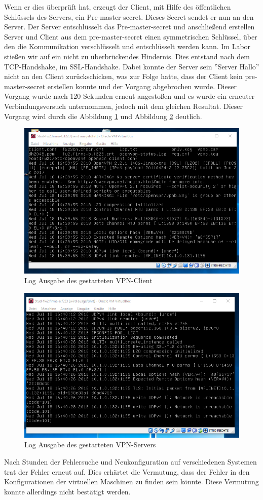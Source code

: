 Wenn er dies überprüft hat, erzeugt der Client, mit Hilfe des öffentlichen Schlüssels des Servers, ein Pre-master-secret. Dieses Secret sendet er nun an den Server. Der Server entschlüsselt das Pre-master-secret und anschließend erstellen Server und Client aus dem pre-master-secret einen symmetrischen Schlüssel, über den die Kommunikation verschlüsselt und entschlüsselt werden kann.\newline
Im Labor stießen wir auf ein nicht zu überbrückendes Hindernis. Dies entstand nach dem TCP-Handshake, im SSL-Handshake. Dabei konnte der Server sein ''Server Hallo'' nicht an den Client zurückschicken, was zur Folge hatte, dass der Client kein pre-master-secret erstellen konnte und der Vorgang abgebrochen wurde. Dieser Vorgang wurde nach 120 Sekunden erneut angestoßen und es wurde ein erneuter Verbindungsversuch unternommen, jedoch mit dem gleichen Resultat. Dieser Vorgang wird durch die Abbildung \ref{fig:logClient} und Abbildung \ref{fig:logServer} deutlich. 
\begin{figure}[h]
	\includegraphics[width=\textwidth]{pictures/clientlog.png}
	\caption{Log Ausgabe des gestarteten VPN-Client}
	\label{fig:logClient}
\end{figure}
\begin{figure}[h]
	\includegraphics[width=\textwidth]{pictures/Serverlog.png}
	\caption{Log Ausgabe des gestarteten VPN-Servers}
	\label{fig:logServer}
\end{figure}
Nach Stunden der Fehlersuche und Neukonfiguration auf verschiedenen Systemen trat der Fehler erneut auf. Dies erhärtet die Vermutung, dass der Fehler in den Konfigurationen der virtuellen Maschinen zu finden sein könnte. Diese Vermutung konnte allerdings nicht bestätigt werden.  